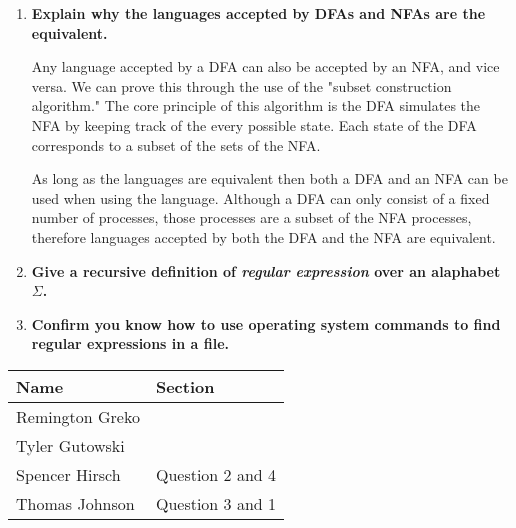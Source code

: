 \documentclass{article}
\begin{document}
\begin{enumerate}
    \medskip

    \item \textbf{Explain why the languages accepted by DFAs and NFAs are the equivalent.}
    
    \medskip

    \-\hspace{0.5cm} Any language accepted by a DFA can also be accepted by an NFA,
     and vice versa. We can prove this through the use of the "subset construction
     algorithm." The core principle of this algorithm is the DFA simulates the NFA
     by keeping track of the every possible state. Each state of the DFA corresponds
     to a subset of the sets of the NFA.

     \-\hspace{0.5cm} As long as the languages are equivalent then both a DFA and an 
     NFA can be used when using the language. Although a DFA can only consist of a 
     fixed number of processes, those processes are a subset of the NFA processes,
     therefore languages accepted by both the DFA and the NFA are equivalent.

    \medskip

    \item \textbf{Give a recursive definition of \textit{regular expression} over
            an alaphabet $\Sigma$.}

    \medskip


    \medskip

    \item \textbf{Confirm you know how to use operating system commands to find
            regular expressions in a file.}

    \medskip


    \medskip
\end{enumerate}

\pagebreak

\begin{center}
    \begin{tabular}{|p{3cm}|p{6cm}|}
        \hline
        \textbf{Name} & \textbf{Section} \\
        \hline
        Remington Greko &  \\
        \hline
        Tyler Gutowski &  \\
        \hline
        Spencer Hirsch &  Question 2 and 4\\
        \hline
        Thomas Johnson &  Question 3 and 1\\
        \hline
    \end{tabular}
\end{center}
\end{document}
